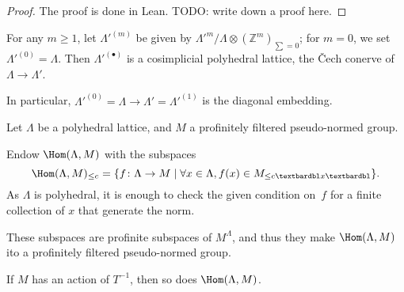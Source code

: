 \begin{proof}
  \leanok
  The proof is done in Lean.
  TODO: write down a proof here.
\end{proof}

\begin{definition}
  \label{cosimplicial-lattice}
  \leanok
  For any $m\geq 1$, let $\Lambda'^{(m)}$ be given by $\Lambda'^m / \Lambda\otimes (\mathbb Z^m)_{\sum=0}$;
  for $m=0$, we set $\Lambda'^{(0)} = \Lambda$.
  Then $\Lambda'^{(\bullet)}$ is a cosimplicial polyhedral lattice,
  the \v{C}ech conerve of $\Lambda\to \Lambda'$.

  In particular, $\Lambda'^{(0)} = \Lambda \to \Lambda' = \Lambda'^{(1)}$
  is the diagonal embedding.
\end{definition}

\begin{definition}
  \label{Hom}
  \leanok
  Let $\Lambda$ be a polyhedral lattice,
  and $M$ a profinitely filtered pseudo-normed group.

  Endow $\Hom(\Lambda, M)$ with the subspaces
  \[
    \Hom(\Lambda, M)_{\leq c} =
    \{f \colon \Lambda \to M \mid
      \forall x \in \Lambda, f(x) \in M_{\leq c‖x‖} \}.
  \]
  As $\Lambda$ is polyhedral, it is enough to check the given condition on~$f$
  for a finite collection of $x$ that generate the norm.

  These subspaces are profinite subspaces of $M^\Lambda$,
  and thus they make $\Hom(\Lambda, M)$ ito a profinitely filtered pseudo-normed group.

  If $M$ has an action of $T^{-1}$, then so does $\Hom(\Lambda, M)$.
\end{definition}


